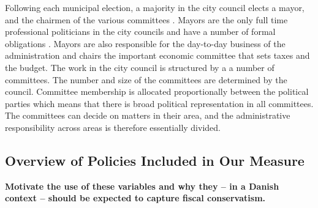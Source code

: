 \documentclass[a4paper,12pt]{article}
\begin{document}
Following each municipal election, a majority in the city council elects a mayor, and the chairmen of the various committees \citep{serritzlew2008explaining}. Mayors are the only full time professional politicians in the city councils and have a number of formal obligations \citep{kjaer2015urban}. Mayors are also responsible for the day-to-day business of the administration and chairs the important economic committee that sets taxes and the budget. The work in the city council is structured by a a number of committees. The number and size of the committees are determined by the council. Committee membership is allocated proportionally between the political parties which means that there is broad political representation in all committees. The committees can decide on matters in their area, and the administrative responsibility across areas is therefore essentially divided. 

\clearpage

\subsection{Overview of Policies Included in Our Measure} \label{policy}


\setcounter{table}{0}
\setcounter{figure}{0}

\textbf{Motivate the use of these variables and why they -- in a Danish context -- should be expected to capture fiscal conservatism.}


\end{document}
